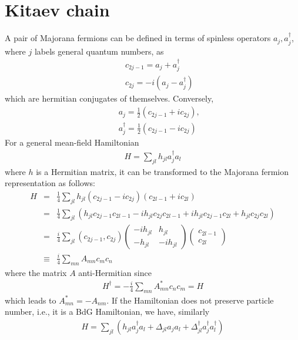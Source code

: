 \section{Kitaev chain}
A pair of Majorana fermions can be defined in terms of spinless operators $a_j, a_j^\dag$, where $j$ labels general quantum numbers, as
\begin{eqnarray}\label{eq:atoc}
	&&c_{2j-1} = a_j+ a_j^\dag\\\nonumber
	&&c_{2j} = -i(a_j - a_j^\dag)
\end{eqnarray}
which are hermitian conjugates of themselves. Conversely,
\begin{eqnarray}\label{eq:ctoa}
	&&a_j =\frac{1}{2} (c_{2j-1} + i c_{2j}),\\\nonumber
	&&a_j^\dag = \frac{1}{2}(c_{2j-1} - i c_{2j})
\end{eqnarray}
For a general mean-field Hamiltonian
\begin{eqnarray}
	H = \sum_{jl} h_{jl} a_j^\dag a_l
\end{eqnarray}
where $h$ is a Hermitian matrix, it can be transformed to the Majorana fermion representation as follows:
\begin{eqnarray}\label{eq:BdGMrep}
	H &=& \frac{1}{4}\sum_{jl} h_{jl} (c_{2j-1} - i c_{2j}) ( c_{2l-1} + i c_{2l})\\\nonumber
	&=& \frac{1}{4}\sum_{jl} (h_{jl} c_{2j-1} c_{2l-1} - i h_{jl} c_{2j} c_{2l-1} + ih_{jl} c_{2j-1} c_{2l} + h_{jl} c_{2j} c_{2l}) \\\nonumber
	&=& \frac{i}{4} \sum_{jl} (c_{2j-1}, c_{2j})\begin{pmatrix}
		-ih_{jl} & h_{jl}\\
		-h_{jl} & -ih_{jl}
	\end{pmatrix}\begin{pmatrix}
	c_{2l-1} \\
	c_{2l}
\end{pmatrix}\\\nonumber
&\equiv&\frac{i}{4}\sum_{mn}A_{mn}c_{m}c_n
\end{eqnarray}
where the matrix $A$ anti-Hermitian since
\begin{eqnarray}
	H^\dag = -\frac{i}{4}\sum_{mn}A_{mn}^* c_n c_m =  H
\end{eqnarray}
which leads to $A_{mn}^* = -A_{nm}$. If the Hamiltonian does not preserve particle number, i.e., it is a BdG Hamiltonian, we have, similarly
\begin{eqnarray}
H = \sum_{jl} \left(h_{jl} a_j^\dag a_l + \Delta_{jl} a_j a_l + \Delta^\dag_{jl}  a_j^\dag a_l^\dag\right)
\end{eqnarray}
